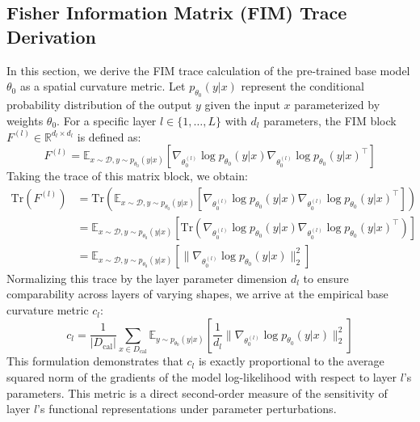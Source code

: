 \documentclass{article}
\theoremstyle{plain}
\theoremstyle{definition}
\theoremstyle{remark}
\begin{document}
\subsection{Fisher Information Matrix (FIM) Trace Derivation}
In this section, we derive the FIM trace calculation of the pre-trained base model $\theta_0$ as a spatial curvature metric. Let $p_{\theta_0}(y|x)$ represent the conditional probability distribution of the output $y$ given the input $x$ parameterized by weights $\theta_0$. For a specific layer $l \in \{1, \dots, L\}$ with $d_l$ parameters, the FIM block $F^{(l)} \in \mathbb{R}^{d_l \times d_l}$ is defined as:
\begin{equation}
F^{(l)} = \mathbb{E}_{x \sim \mathcal{D}, y \sim p_{\theta_0}(y|x)} \left[ \nabla_{\theta_0^{(l)}} \log p_{\theta_0}(y|x) \nabla_{\theta_0^{(l)}} \log p_{\theta_0}(y|x)^\top \right]
\end{equation}
Taking the trace of this matrix block, we obtain:
\begin{align}
\text{Tr}(F^{(l)}) &= \text{Tr}\left( \mathbb{E}_{x \sim \mathcal{D}, y \sim p_{\theta_0}(y|x)} \left[ \nabla_{\theta_0^{(l)}} \log p_{\theta_0}(y|x) \nabla_{\theta_0^{(l)}} \log p_{\theta_0}(y|x)^\top \right] \right) \nonumber \\
&= \mathbb{E}_{x \sim \mathcal{D}, y \sim p_{\theta_0}(y|x)} \left[ \text{Tr}\left( \nabla_{\theta_0^{(l)}} \log p_{\theta_0}(y|x) \nabla_{\theta_0^{(l)}} \log p_{\theta_0}(y|x)^\top \right) \right] \nonumber \\
&= \mathbb{E}_{x \sim \mathcal{D}, y \sim p_{\theta_0}(y|x)} \left[ \|\nabla_{\theta_0^{(l)}} \log p_{\theta_0}(y|x)\|_2^2 \right]
\end{align}
Normalizing this trace by the layer parameter dimension $d_l$ to ensure comparability across layers of varying shapes, we arrive at the empirical base curvature metric $c_l$:
\begin{equation}
c_l = \frac{1}{|D_{\text{cal}}|} \sum_{x \in D_{\text{cal}}} \mathbb{E}_{y \sim p_{\theta_0}(y|x)} \left[ \frac{1}{d_l} \|\nabla_{\theta_0^{(l)}} \log p_{\theta_0}(y|x)\|_2^2 \right]
\end{equation}
This formulation demonstrates that $c_l$ is exactly proportional to the average squared norm of the gradients of the model log-likelihood with respect to layer $l$\rq s parameters. This metric is a direct second-order measure of the sensitivity of layer $l$\rq s functional representations under parameter perturbations.
\end{document}
